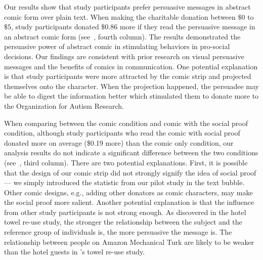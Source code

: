 \begin{description} [leftmargin=\parindent,topsep=0pt,partopsep=3pt,parsep=0pt,itemsep=3pt, listparindent=\parindent]
    \item[Comic vs. Plain Text:] Our results show that study participants prefer persuasive messages in abstract comic form over plain text. When making the charitable donation between $\$0$ to $\$5$, study participants donated $\$ 0.86$ more if they read the persuasive message in an abstract comic form (see~, fourth column). The results demonstrated the persuasive power of abstract comic in stimulating behaviors in pro-social decisions. Our findings are consistent with prior research on visual persuasive messages and the benefits of comics in communication. One potential explanation is that study participants were more attracted by the comic strip and projected themselves onto the character. When the projection happened, the persuadee may be able to digest the information better which stimulated them to donate more to the Organization for Autism Research. 
    
    \item[Social Proof Condition:] When comparing between the comic condition and comic with the social proof condition, although study participants who read the comic with social proof donated more on average (\$0.19 more) than the comic only condition, our analysis results do not indicate a significant difference between the two conditions (see~, third column). There are two potential explanations. First, it is possible that the design of our comic strip did not strongly signify the idea of social proof --- we simply introduced the statistic from our pilot study in the text bubble. Other comic designs, e.g., adding other donators as comic characters, may make the social proof more salient. Another potential explanation is that the influence from other study participants is not strong enough. As \textcite{goldstein2008room} discovered in the hotel towel re-use study, the stronger the relationship between the subject and the reference group of individuals is, the more persuasive the message is. The relationship between people on Amazon Mechanical Turk are likely to be weaker than the hotel guests in \textcite{goldstein2008room}'s towel re-use study.


\end{description}
